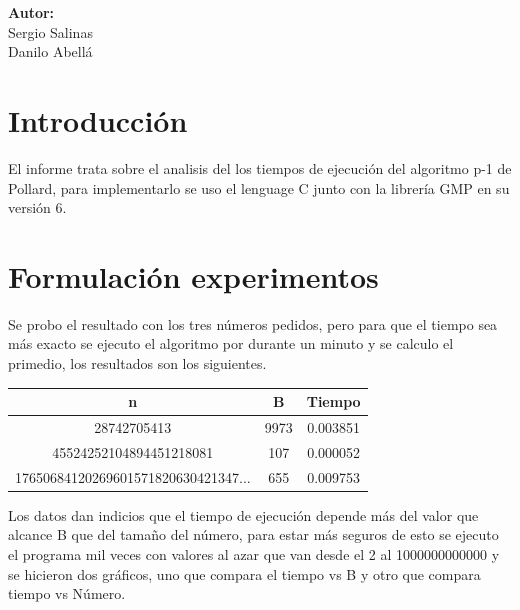 \documentclass[12pt,letterpaper]{scrartcl}
\begin{document}
\begin{titlepage}
\begin{center}
\begin{minipage}[l]{0.4\textwidth}
	\begin{flushright}

		\textbf{\textsf{Autor:}}\\
		\linespread{1}
		\large Sergio Salinas\\
		\large Danilo Abellá\\

	\end{flushright}
\end{minipage}

\end{center}

\end{titlepage}



\newpage

\tableofcontents

\newpage
\section{Introducción}

El informe trata sobre el analisis del los tiempos de ejecución del algoritmo p-1 de Pollard, para implementarlo se uso el lenguage C junto con la librería GMP en su versión 6.

\newpage
\section{Formulación experimentos}

Se probo el resultado con los tres números pedidos, pero para que el tiempo sea más exacto se ejecuto el algoritmo por durante un minuto y se calculo el primedio, los resultados son los siguientes.\\
	
\begin{center}
\begin{tabular}{|c|c|c|}
\hline 
n & B & Tiempo \\ 
\hline 
28742705413 & 9973 & 0.003851 \\ 
\hline 
45524252104894451218081 & 107 & 0.000052 \\ 
\hline 
17650684120269601571820630421347...
 & 655 & 0.009753 \\ 
\hline 
\end{tabular} 
\end{center}

Los datos dan indicios que el tiempo de ejecución depende más del valor que alcance B que del tamaño del número, para estar más seguros de esto se ejecuto el programa mil veces con valores al azar que van desde el 2 al 1000000000000 y se hicieron dos gráficos, uno que compara el tiempo vs B y otro que compara tiempo vs Número.\\
\end{document}
